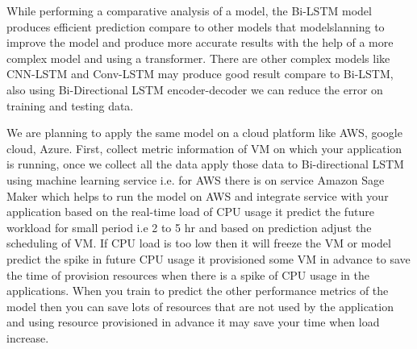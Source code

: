 While performing a comparative analysis of a model, the Bi-LSTM model produces efficient prediction compare to other models that modelslanning to improve the model and produce more accurate results with the help of a more complex model and using a transformer. There are other complex models like CNN-LSTM and Conv-LSTM may produce good result compare to Bi-LSTM, also using Bi-Directional LSTM encoder-decoder we can reduce the error on training and testing data.

We are planning to apply the same model on a cloud platform like AWS, google cloud, Azure. First, collect metric information of VM on which your application is running, once we collect all the data apply those data to Bi-directional LSTM using machine learning service i.e. for AWS there is on service Amazon Sage Maker which helps to run the model on AWS and integrate service with your application based on the real-time load of CPU usage it predict the future workload for small period i.e 2 to 5 hr and based on prediction adjust the scheduling of VM. If CPU load is too low then it will freeze the VM or model predict the spike in future CPU usage it provisioned some VM in advance to save the time of provision resources when there is a spike of CPU usage in the applications.  When you train to predict the other performance metrics of the model then you can save lots of resources that are not used by the application and using resource provisioned in advance it may save your time when load increase.
